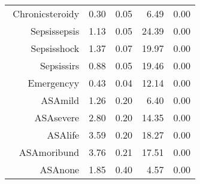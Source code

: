 \begin{tabular}{rrrrr}
$$  Chronic\-steroid\-y & 0.30 & 0.05 & 6.49 & 0.00 \\ 
  Sepsis\-sepsis & 1.13 & 0.05 & 24.39 & 0.00 \\ 
  Sepsis\-shock & 1.37 & 0.07 & 19.97 & 0.00 \\ 
  Sepsis\-sirs & 0.88 & 0.05 & 19.46 & 0.00 \\ 
  Emergency\-y & 0.43 & 0.04 & 12.14 & 0.00 \\ 
  ASA\-mild & 1.26 & 0.20 & 6.40 & 0.00 \\ 
  ASA\-severe & 2.80 & 0.20 & 14.35 & 0.00 \\ 
  ASA\-life & 3.59 & 0.20 & 18.27 & 0.00 \\ 
  ASA\-moribund & 3.76 & 0.21 & 17.51 & 0.00 \\ 
  ASA\-none & 1.85 & 0.40 & 4.57 & 0.00 \\ 
   \hline
\end{tabular}

